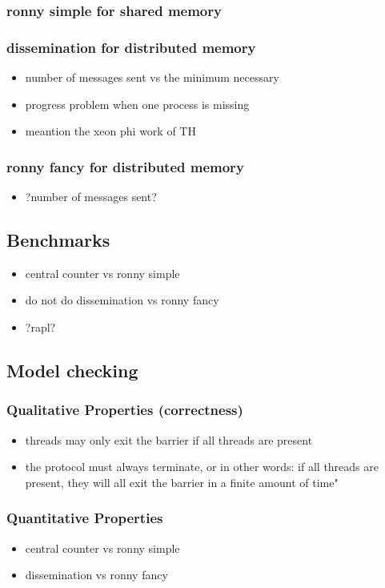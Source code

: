 \documentclass[a4paper, 10pt]{article}
\begin{document}
\subsubsection{ronny simple for shared memory}
\subsubsection{dissemination for distributed memory}
\begin{itemize}
	\item number of messages sent vs the minimum necessary
	\item progress problem when one process is missing
	\item meantion the xeon phi work of TH
\end{itemize}
\subsubsection{ronny fancy for distributed memory}
\begin{itemize}
	\item ?number of messages sent?
\end{itemize}

\subsection{Benchmarks}
\begin{itemize}
	\item central counter vs ronny simple
	\item do not do dissemination vs ronny fancy
	\item ?rapl?
\end{itemize}

\subsection{Model checking}
\subsubsection{Qualitative Properties (correctness)}
\begin{itemize}
	\item threads may only exit the barrier if all threads are present
	\item the protocol must always terminate, or in other words: if all threads are present, they will all exit the barrier in a finite amount of time"
\end{itemize}
\subsubsection{Quantitative Properties}
\begin{itemize}
	\item central counter vs ronny simple
	\item dissemination vs ronny fancy
\end{itemize}
\end{document}
